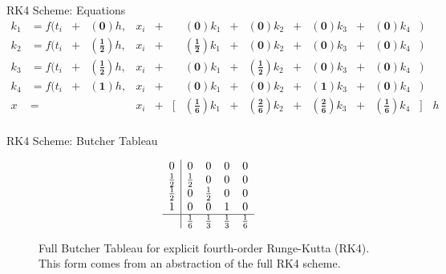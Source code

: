 \documentclass{beamer}
\begin{document}
\begin{frame}{RK4 Scheme: Equations}
    \small
\begin{equation}
\begin{aligned}
    k_1 &= f(t_i & + &(\mathbf{          0})h, &x_i& + & & (\mathbf{          0})k_1& + & (\mathbf{          0})k_2& + &           (\mathbf{0})k_3& + &           (\mathbf{0})k_4&)&\\
    k_2 &= f(t_i & + &(\mathbf{\frac{1}{2}})h, &x_i& + & & (\mathbf{\frac{1}{2}})k_1& + & (\mathbf{          0})k_2& + &           (\mathbf{0})k_3& + &           (\mathbf{0})k_4&)&\\
    k_3 &= f(t_i & + &(\mathbf{\frac{1}{2}})h, &x_i& + & & (\mathbf{          0})k_1& + & (\mathbf{\frac{1}{2}})k_2& + &           (\mathbf{0})k_3& + &           (\mathbf{0})k_4&)&\\
    k_4 &= f(t_i & + &(\mathbf{          1})h, &x_i& + & & (\mathbf{          0})k_1& + & (\mathbf{          0})k_2& + &           (\mathbf{1})k_3& + &           (\mathbf{0})k_4&)&\\
    x   &=       &   &                         &x_i& + &[& (\mathbf{\frac{1}{6}})k_1& + & (\mathbf{\frac{2}{6}})k_2& + & (\mathbf{\frac{2}{6}})k_3& + & (\mathbf{\frac{1}{6}})k_4 &]&h\\
    \label{eqn: more general rk4}
\end{aligned}
\end{equation}
\end{frame}

\begin{frame}{RK4 Scheme: Butcher Tableau}
\begin{figure}[h!]
    {\renewcommand\arraystretch{1.2}
    \begin{equation*}
        \begin{array}{ c|ccccc }
            0              & 0           & 0           & 0      &0\\
            \frac{1}{2}    & \frac{1}{2} & 0           & 0      &0\\
            \frac{1}{2}    & 0           & \frac{1}{2} & 0      &0\\
            1              & 0           & 0           & 1      &0\\
            \hline
            & \frac{1}{6} & \frac{1}{3}& \frac{1}{3}  & \frac{1}{6}\\
        \end{array}
    \end{equation*}
    \caption[Full Butcher Tableau for explicit fourth-order Runge-Kutta (RK4)] {
                Full Butcher Tableau for explicit fourth-order Runge-Kutta (RK4).
				This form comes from an abstraction of the full RK4 scheme.
            }
    \label{fig: full rk4 butcher}
    }
\end{figure}
\end{frame}
\end{document}
